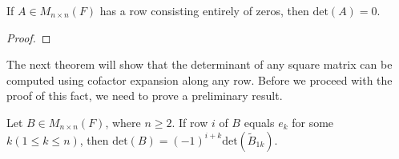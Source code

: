 \begin{corollary}
    If \( A \in {M}_{n \times n }(F) \) has a row consisting entirely of zeros, then \( \text{det}(A) =  0  \).
\end{corollary}
\begin{proof}

\end{proof}

The next theorem will show that the determinant of any square matrix can be computed using cofactor expansion along any row. Before we proceed with the proof of this fact, we need to prove a preliminary result.

\begin{lemma}
    Let \( B \in {M}_{n \times n}(F)  \), where \( n \geq 2 \). If row \( i  \) of \( B  \) equals \( {e}_{k } \) for some \( k (1 \leq k \leq n) \), then \( \text{det}(B) = (-1)^{i+k } \text{det}({\tilde{B}}_{1k }) \).
\end{lemma}
